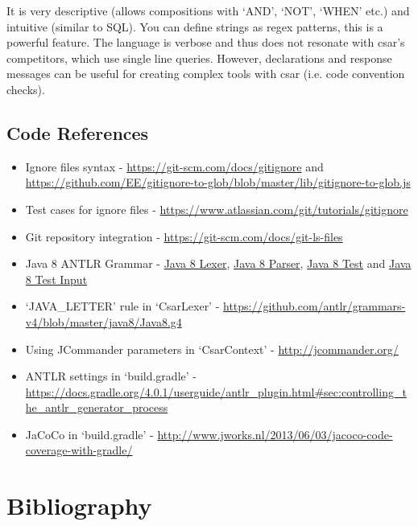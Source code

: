 \documentclass[12pt, letterpaper]{article}
\begin{document}
It is very descriptive (allows compositions with `AND', `NOT', `WHEN' etc.) and intuitive (similar to SQL). You can define strings as regex patterns, this is a powerful feature.
The language is verbose and thus does not resonate with csar's competitors, which use single line queries.
However, declarations and response messages can be useful for creating complex tools with csar (i.e. code convention checks).

\subsection{Code References}
\begin{itemize}
    \item Ignore files syntax - \url{https://git-scm.com/docs/gitignore} and \url{https://github.com/EE/gitignore-to-glob/blob/master/lib/gitignore-to-glob.js}
    \item Test cases for ignore files - \url{https://www.atlassian.com/git/tutorials/gitignore}
    \item Git repository integration - \url{https://git-scm.com/docs/git-ls-files}
    \item Java 8 ANTLR Grammar - \href{https://github.com/antlr/grammars-v4/blob/02711067f82bed8e0c8dfd25e80f4f8ae2472abd/java8-pt/JavaLexer.g4}{Java 8 Lexer}, \href{https://github.com/antlr/grammars-v4/blob/02711067f82bed8e0c8dfd25e80f4f8ae2472abd/java8-pt/JavaParser.g4}{Java 8 Parser}, \href{https://github.com/antlr/grammars-v4/blob/02711067f82bed8e0c8dfd25e80f4f8ae2472abd/_grammar-test/src/test/java/TestJava8pt.java}{Java 8 Test} and \href{https://github.com/antlr/grammars-v4/blob/02711067f82bed8e0c8dfd25e80f4f8ae2472abd/java8-pt/examples/AllInOne8.java}{Java 8 Test Input}
    \item `JAVA\_LETTER' rule in `CsarLexer' - \url{https://github.com/antlr/grammars-v4/blob/master/java8/Java8.g4}
    \item Using JCommander parameters in `CsarContext' - \url{http://jcommander.org/}
    \item ANTLR settings in `build.gradle' - \url{https://docs.gradle.org/4.0.1/userguide/antlr\_plugin.html\#sec:controlling\_the\_antlr\_generator\_process}
    \item JaCoCo in `build.gradle' - \url{http://www.jworks.nl/2013/06/03/jacoco-code-coverage-with-gradle/}
\end{itemize}

\section{Bibliography}
\printbibliography[heading=none]
\end{document}
